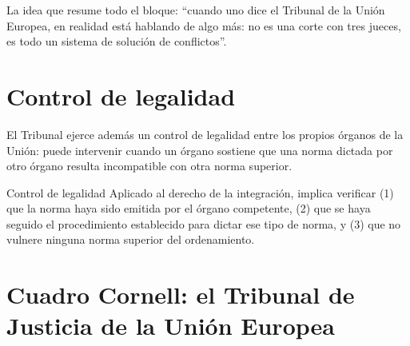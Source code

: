 \documentclass[12pt,oneside]{book}
\begin{document}
La idea que resume todo el bloque: “cuando uno dice el Tribunal de la Unión Europea, en realidad está hablando de algo más: no es una corte con tres jueces, es todo un sistema de solución de conflictos”.

\section{Control de legalidad}

El Tribunal ejerce además un control de legalidad entre los propios órganos de la Unión: puede intervenir cuando un órgano sostiene que una norma dictada por otro órgano resulta incompatible con otra norma superior.

\begin{definition}{Control de legalidad}
Aplicado al derecho de la integración, implica verificar (1) que la norma haya sido emitida por el órgano competente, (2) que se haya seguido el procedimiento establecido para dictar ese tipo de norma, y (3) que no vulnere ninguna norma superior del ordenamiento.
\end{definition}

\section{Cuadro Cornell: el Tribunal de Justicia de la Unión Europea}
\end{document}
